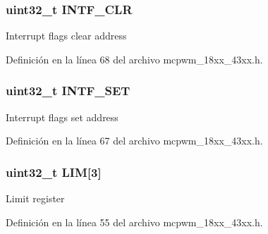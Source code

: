 \subsubsection[{\texorpdfstring{I\+N\+T\+F\+\_\+\+C\+LR}{INTF_CLR}}]{ uint32\+\_\+t I\+N\+T\+F\+\_\+\+C\+LR}\hypertarget{struct_l_p_c___m_c_p_w_m___t_a14cf2abcb9f72e3a14c52975cc24775a}{}\label{struct_l_p_c___m_c_p_w_m___t_a14cf2abcb9f72e3a14c52975cc24775a}
Interrupt flags clear address 

Definición en la línea 68 del archivo mcpwm\+\_\+18xx\+\_\+43xx.\+h.

\subsubsection[{\texorpdfstring{I\+N\+T\+F\+\_\+\+S\+ET}{INTF_SET}}]{ uint32\+\_\+t I\+N\+T\+F\+\_\+\+S\+ET}\hypertarget{struct_l_p_c___m_c_p_w_m___t_abdcdeb268573598c709e0c4fcfa95719}{}\label{struct_l_p_c___m_c_p_w_m___t_abdcdeb268573598c709e0c4fcfa95719}
Interrupt flags set address 

Definición en la línea 67 del archivo mcpwm\+\_\+18xx\+\_\+43xx.\+h.

\subsubsection[{\texorpdfstring{L\+IM}{LIM}}]{ uint32\+\_\+t L\+IM\mbox{[}3\mbox{]}}\hypertarget{struct_l_p_c___m_c_p_w_m___t_abca2b4a04a9dcee64432a8ecfeff6798}{}\label{struct_l_p_c___m_c_p_w_m___t_abca2b4a04a9dcee64432a8ecfeff6798}
Limit register 

Definición en la línea 55 del archivo mcpwm\+\_\+18xx\+\_\+43xx.\+h.


